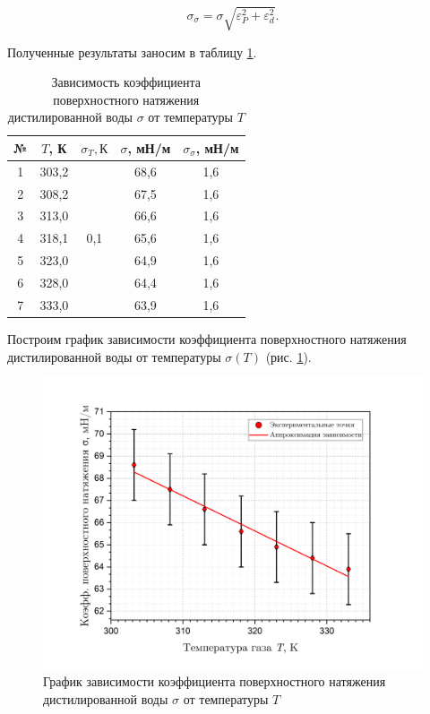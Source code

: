 \documentclass[a4paper, 12pt]{article}
\begin{document}
    \begin{equation}
        \label{otn_pogr}
        \sigma_\sigma = \sigma\sqrt{\varepsilon^2_P + \varepsilon^2_d}.
    \end{equation}

    \noindent Полученные результаты заносим в таблицу \ref{tab:temp}.

    \begin{table}[H]
    	\centering
    	\begin{tabular}{|c|c|c|c|c|}
    		\hline
                № & $ T $, К   & $ \sigma_T, К $   & $ \sigma $, мН/м & $\sigma_\sigma $, мН/м \\ \hline
                1 & 303,2 & \multirow{7}{*}{0,1} & 68,6 & 1,6 \\ \cline{1-2} \cline{4-5} 
                2 & 308,2 &  & 67,5 & 1,6 \\ \cline{1-2} \cline{4-5} 
                3 & 313,0 &  & 66,6 & 1,6 \\ \cline{1-2} \cline{4-5} 
                4 & 318,1 &  & 65,6 & 1,6 \\ \cline{1-2} \cline{4-5} 
                5 & 323,0 &  & 64,9 & 1,6 \\ \cline{1-2} \cline{4-5} 
                6 & 328,0 &  & 64,4 & 1,6 \\ \cline{1-2} \cline{4-5} 
                7 & 333,0 &  & 63,9 & 1,6 \\ \hline
    	\end{tabular}
            \caption{Зависимость коэффициента поверхностного натяжения дистилированной воды $\sigma$ от температуры $T$}
    	\label{tab:temp}
    \end{table}

    \noindent Построим график зависимости коэффициента поверхностного натяжения дистилированной воды от температуры $\sigma(T)$ (рис. \ref{sigma(T)}).

     \begin{figure}[H]
        \centering
        \includegraphics[width=14cm]{images/sigma(T).png}
        \caption{График зависимости коэффициента поверхностного натяжения дистилированной воды $\sigma$ от температуры $T$}
        \label{sigma(T)}
    \end{figure}
    
\end{document}

